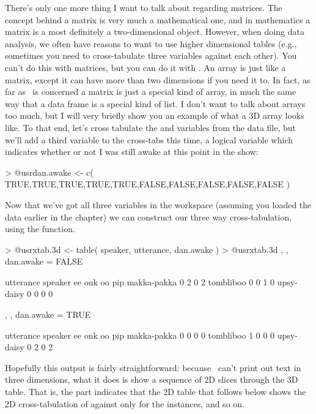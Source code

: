 There's only one more thing I want to talk about regarding matrices. The concept behind a matrix is very much a mathematical one, and in mathematics a matrix is a most definitely a two-dimensional object. However, when doing data analysis, we often have reasons to want to use higher dimensional tables (e.g., sometimes you need to cross-tabulate three variables against each other). You can't do this with matrices, but you can do it with . An array is just like a matrix, except it can have more than two dimensions if you need it to. In fact, as far as \R\ is concerned a matrix is just a special kind of array, in much the same way that a data frame is a special kind of list. I don't want to talk about arrays too much, but I will very briefly show you an example of what a 3D array looks like. To that end, let's cross tabulate the  and  variables from the  data file, but we'll add a third variable to the cross-tabs this time, a logical variable which indicates whether or not I was still awake at this point in the show:
\begin{rblock1}
> @usr{dan.awake <- c( TRUE,TRUE,TRUE,TRUE,TRUE,FALSE,FALSE,FALSE,FALSE,FALSE )}
\end{rblock1}
Now that we've got all three variables in the workspace (assuming you loaded the  data earlier in the chapter) we can construct our three way cross-tabulation, using the  function. 
\begin{rblock1}
> @usr{xtab.3d <- table( speaker, utterance, dan.awake )}
> @usr{xtab.3d}
, , dan.awake = FALSE

             utterance
speaker       ee onk oo pip
  makka-pakka  0   2  0   2
  tombliboo    0   0  1   0
  upsy-daisy   0   0  0   0

, , dan.awake = TRUE

             utterance
speaker       ee onk oo pip
  makka-pakka  0   0  0   0
  tombliboo    1   0  0   0
  upsy-daisy   0   2  0   2
\end{rblock1}
Hopefully this output is fairly straightforward: because \R\ can't print out text in three dimensions, what it does is show a sequence of 2D slices through the 3D table. That is, the  part indicates that the 2D table that follows below shows the 2D cross-tabulation of  against  only for the  instances, and so on.


